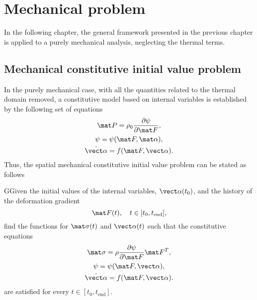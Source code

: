 \chapter{Mechanical problem} \label{ch:mechanical_problem}

In the following chapter, the general framework presented in the previous chapter is applied to a purely mechanical analysis, neglecting the thermal terms.

\section{Mechanical constitutive initial value problem}

In the purely mechanical case, with all the quantities related to the thermal domain removed, a constitutive model based on internal variables is established by the following set of equations
    \begin{gather}
        \mat P = \rho_0 \frac{\partial \psi}{\partial \mat F},\\
        \psi = \psi(\mat F,\mat \alpha),\\
        \dot{\vect \alpha} = f(\mat F, \vect \alpha).
    \end{gather}
  Thus, the spatial mechanical constitutive initial value problem can be stated as follows
  \begin{problem}
  GGiven the initial values of the internal variables, $\vect \alpha(t_0)$, and the history of the deformation gradient
  \begin{equation}
      \mat F(t),\quad t\in[t_0,t_\text{end}],
  \end{equation}
  find the functions for $\mat \sigma(t)$ and $\vect \alpha(t)$ such that the constitutive equations
  \begin{gather}
      \mat \sigma = \rho \frac{\partial \psi}{\partial \mat F} \mat F^T,\\
      \psi = \psi(\mat F, \vect \alpha),\\
      \dot{\vect \alpha} = f(\mat F, \vect \alpha).
  \end{gather}
  are satisfied for every $t\in [t_0, t_\text{end}]$.
  \end{problem}


